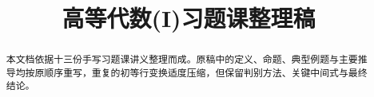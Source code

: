 \documentclass[UTF8,a4paper,11pt]{ctexart}
\title{高等代数(I)习题课整理稿}
\date{}
\numberwithin{equation}{section}
\theoremstyle{plain}
\theoremstyle{definition}
\theoremstyle{remark}
\begin{document}
\maketitle
\begin{abstract}
  本文档依据十三份手写习题课讲义整理而成。原稿中的定义、命题、典型例题与主要推导均按原顺序重写，重复的初等行变换适度压缩，但保留判别方法、关键中间式与最终结论。
\end{abstract}
\tableofcontents
\clearpage














\end{document}
